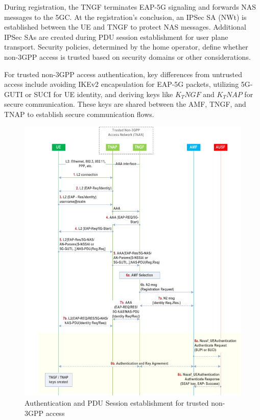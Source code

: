 During registration, the TNGF terminates EAP-5G signaling and forwards NAS messages to the 5GC. At the registration's conclusion, an IPSec SA (NWt) is established between the UE and TNGF to protect NAS messages. Additional IPSec SAs are created during PDU session establishment for user plane transport. Security policies, determined by the home operator, define whether non-3GPP access is trusted based on security domains or other considerations.

For trusted non-3GPP access authentication, key differences from untrusted access include avoiding IKEv2 encapsulation for EAP-5G packets, utilizing 5G-GUTI or SUCI for UE identity, and deriving keys like $K_TNGF$ and $K_TNAP$ for secure communication. These keys are shared between the AMF, TNGF, and TNAP to establish secure communication flows.

\begin{figure}
    \centering
    \includegraphics[width=0.75\linewidth]{figs/Authentication and PDU Session establishment for trusted non-3GPP access_1.png}
    \caption{Authentication and PDU Session establishment for trusted non-3GPP access}
    \label{fig:Authentication and PDU Session establishment for trusted non-3GPP access_1}
\end{figure}

